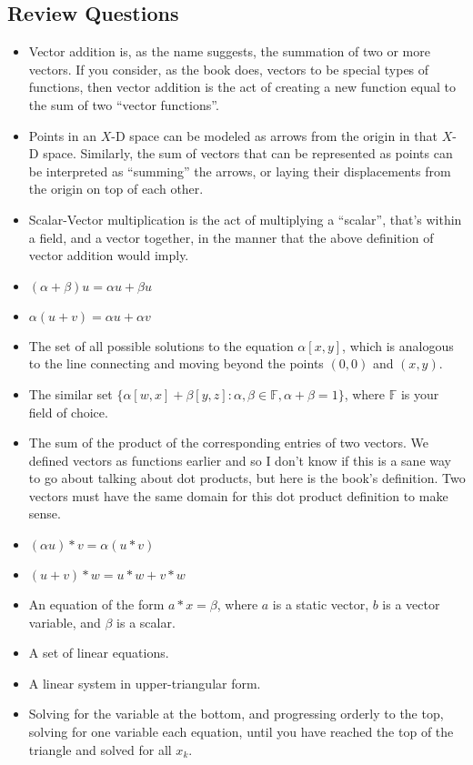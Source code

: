 \documentclass{article}
\begin{document}
    \subsection{Review Questions}
    \begin{itemize}
        \item Vector addition is, as the name suggests, the summation of two or
            more vectors.  If you consider, as the book does, vectors to be
            special types of functions, then vector addition is the act of
            creating a new function equal to the sum of two ``vector functions''.
        \item Points in an $X$-D space can be modeled as arrows from the origin
            in that $X$-D space.  Similarly, the sum of vectors that can be represented as
            points can be interpreted as ``summing'' the arrows, or laying their displacements
            from the origin on top of each other.
        \item Scalar-Vector multiplication is the act of multiplying a
            ``scalar'', that's within a field, and a vector together, in the
            manner that the above definition of vector addition would imply.
        \item $(\alpha + \beta)u = \alpha u + \beta u$
        \item $\alpha (u + v) = \alpha u + \alpha v$
        \item The set of all possible solutions to the equation $\alpha [x,y]$,
            which is analogous to the line connecting and moving beyond the
            points $(0,0)$ and $(x,y)$.
        \item The similar set $\{\alpha [w,x] + \beta [y,z] : \alpha, \beta \in
            \mathbb{F}, \alpha + \beta = 1\}$, where $\mathbb{F}$ is your field of choice.
        \item The sum of the product of the corresponding entries of two
            vectors. We defined vectors as functions earlier and so I don't
            know if this is a sane way to go about talking about dot products,
            but here is the book's definition. Two vectors must have the same
            domain for this dot product definition to make sense.
        \item $(\alpha u) * v = \alpha (u * v)$
        \item $(u + v) * w = u * w + v * w$
        \item An equation of the form $a * x = \beta$, where $a$ is a static
            vector, $b$ is a vector variable, and $\beta$ is a scalar.
        \item A set of linear equations.
        \item A linear system in upper-triangular form.
        \item Solving for the variable at the bottom, and progressing orderly
            to the top, solving for one variable each equation, until you have
            reached the top of the triangle and solved for all $x_k$.
    \end{itemize}
\end{document}
